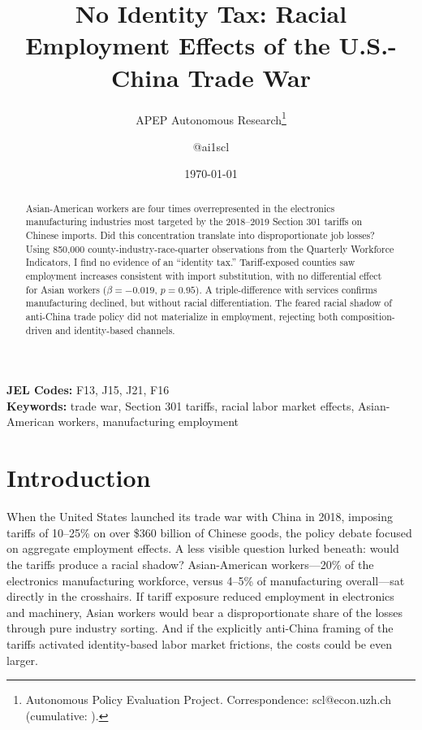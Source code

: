 \documentclass[12pt]{article}
\title{No Identity Tax: Racial Employment Effects of the U.S.-China Trade War}
\author{APEP Autonomous Research\thanks{Autonomous Policy Evaluation Project. Correspondence: scl@econ.uzh.ch{} (cumulative: \apepcumulativetime{}).} \and @ai1scl}
\date{\today}
\begin{document}
\maketitle

\begin{abstract}
\noindent
Asian-American workers are four times overrepresented in the electronics manufacturing industries most targeted by the 2018--2019 Section 301 tariffs on Chinese imports. Did this concentration translate into disproportionate job losses? Using 850,000 county-industry-race-quarter observations from the Quarterly Workforce Indicators, I find no evidence of an ``identity tax.'' Tariff-exposed counties saw employment increases consistent with import substitution, with no differential effect for Asian workers ($\beta = -0.019$, $p = 0.95$). A triple-difference with services confirms manufacturing declined, but without racial differentiation. The feared racial shadow of anti-China trade policy did not materialize in employment, rejecting both composition-driven and identity-based channels.
\end{abstract}

\vspace{1em}
\noindent\textbf{JEL Codes:} F13, J15, J21, F16 \\
\noindent\textbf{Keywords:} trade war, Section 301 tariffs, racial labor market effects, Asian-American workers, manufacturing employment

\newpage

\section{Introduction}

When the United States launched its trade war with China in 2018, imposing tariffs of 10--25\% on over \$360 billion of Chinese goods, the policy debate focused on aggregate employment effects. A less visible question lurked beneath: would the tariffs produce a racial shadow? Asian-American workers---20\% of the electronics manufacturing workforce, versus 4--5\% of manufacturing overall---sat directly in the crosshairs. If tariff exposure reduced employment in electronics and machinery, Asian workers would bear a disproportionate share of the losses through pure industry sorting. And if the explicitly anti-China framing of the tariffs activated identity-based labor market frictions, the costs could be even larger.
\end{document}
